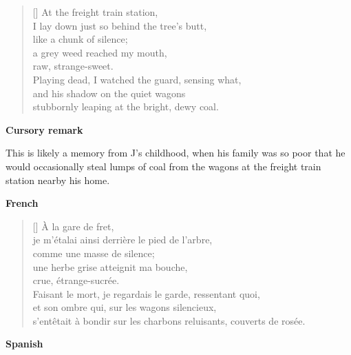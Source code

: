 \documentclass[a4paper,12pt,twoside,final]{book}
\begin{document}

\settowidth{\versewidth}{stubbornly leaping at the bright, dewy coal.}

\begin{verse}[\versewidth]
  At the freight train station, \\
  I lay down just so behind the tree's butt, \\
  like a chunk of silence; \\
  a grey weed reached my mouth, \\
  raw, strange-sweet. \\
  Playing dead, I watched the guard, sensing what, \\
  and his shadow on the quiet wagons \\
  stubbornly leaping at the bright, dewy coal. \\
\end{verse}

\bigskip

\noindent \textbf{Cursory remark}

\medskip

This is likely a memory from J's childhood, when his family was so
poor that he would occasionally steal lumps of coal from the wagons at
the freight train station nearby his home.

\bigskip

\noindent \textbf{French}


\settowidth{\versewidth}{s'entêtait à bondir sur les charbons reluisants, couverts de rosée.}

\begin{verse}[\versewidth]
  À la gare de fret, \\
  je m'étalai ainsi derrière le pied de l'arbre, \\
  comme une masse de silence; \\
  une herbe grise atteignit ma bouche, \\
  crue, étrange-sucrée. \\
  Faisant le mort, je regardais le garde, ressentant quoi, \\
  et son ombre qui, sur les wagons silencieux, \\
  s'entêtait à bondir sur les charbons reluisants, couverts de rosée. \\
\end{verse}

\bigskip

\noindent \textbf{Spanish}
\end{document}
